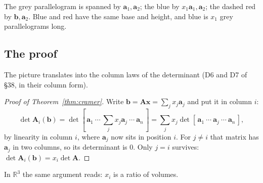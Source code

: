 \documentclass[11pt]{article}
\theoremstyle{plain}
\theoremstyle{definition}
\theoremstyle{remark}
\newcommand{\R}{\mathbb{R}}
\newcommand{\vc}[1]{\mathbf{#1}}
\newcommand{\mt}[1]{\mathbf{#1}}
\begin{document}
\begin{center}
\end{center}

\noindent The grey parallelogram is spanned by $\vc{a}_1,\vc{a}_2$; the blue by
$x_1\vc{a}_1,\vc{a}_2$; the dashed red by $\vc{b},\vc{a}_2$. Blue and red have
the same base and height, and blue is $x_1$ grey parallelograms long.

\subsection{The proof}
The picture translates into the column laws of the determinant (D6 and D7 of
\S38, in their column form).

\begin{proof}[Proof of Theorem~\ref{thm:cramer}]
Write $\vc{b}=\mt{A}\vc{x}=\sum_{j}x_j\vc{a}_j$ and put it in column $i$:
\[
  \det\mt{A}_i(\vc{b})
  =\det[\,\vc{a}_1\ \cdots\ \textstyle\sum_jx_j\vc{a}_j\ \cdots\ \vc{a}_n\,]
  =\sum_{j}x_j\det[\,\vc{a}_1\ \cdots\ \vc{a}_j\ \cdots\ \vc{a}_n\,],
\]
by linearity in column $i$, where $\vc{a}_j$ now sits in position $i$. For
$j\neq i$ that matrix has $\vc{a}_j$ in two columns, so its determinant is $0$.
Only $j=i$ survives: $\det\mt{A}_i(\vc{b})=x_i\det\mt{A}$.
\end{proof}

\noindent In $\R^{3}$ the same argument reads: $x_i$ is a ratio of volumes.
\end{document}
